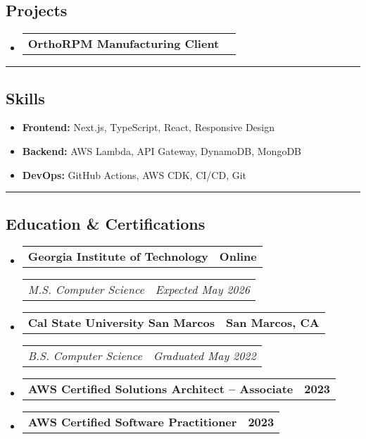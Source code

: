 \documentclass[11pt,letterpaper]{article}
\makeatletter
\newcommand{\headerrow}[2]
{\begin{tabular*}{\linewidth}{l@{\extracolsep{\fill}}r}
#1 &
#2 \\
\end{tabular*}}
\makeatother
\begin{document}
\subsection*{\Large Projects}

\begin{itemize}[leftmargin=1em]
    \item
        \headerrow
        {\textbf{OrthoRPM Manufacturing Client}}
        {}
\end{itemize}

\hrule
\vspace{-1em}
\subsection*{\Large Skills}

\begin{itemize}[leftmargin=1em,noitemsep]
    \item \textbf{Frontend:}
          Next.js, TypeScript, React, Responsive Design
    \item \textbf{Backend:}
          AWS Lambda, API Gateway, DynamoDB, MongoDB
    \item \textbf{DevOps:}
          GitHub Actions, AWS CDK, CI/CD, Git
\end{itemize}
\hrule
\subsection*{\Large Education \& Certifications}

\begin{itemize}[leftmargin=1em]
    \parskip=0.1em
        
    \item
        \headerrow
        {\textbf{Georgia Institute of Technology}}
        {\textbf{Online}}
        \headerrow
        {\emph{M.S. Computer Science}}
        {\emph{Expected May 2026}}
        
    \item
        \headerrow
        {\textbf{Cal State University San Marcos}}
        {\textbf{San Marcos, CA}}
        \headerrow
        {\emph{B.S. Computer Science}}
        {\emph{Graduated May 2022}}
        
    \item
        \headerrow
        {\textbf{AWS Certified Solutions Architect -- Associate}}
        {\textbf{2023}}
        
    \item
        \headerrow
        {\textbf{AWS Certified Software Practitioner}}
        {\textbf{2023}}
\end{itemize}
\end{document}
